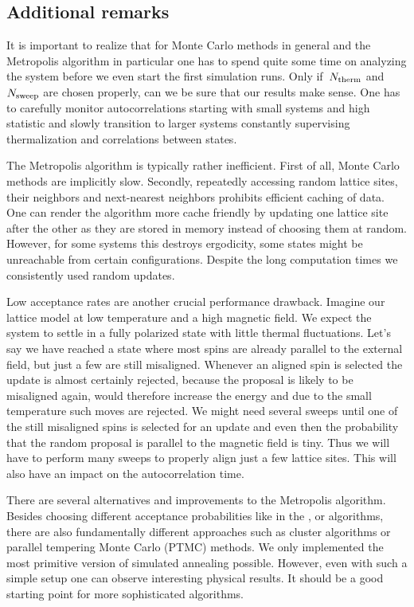 \subsection{Additional remarks}

It is important to realize that for Monte Carlo methods in general and the
Metropolis algorithm in particular one has to spend quite some time on analyzing
the system before we even start the first simulation runs. Only if~$N_{\mathrm{therm}}$
and~$N_{\mathrm{sweep}}$ are chosen properly, can we be sure that our results make sense.
One has to carefully monitor autocorrelations starting with small systems and
high statistic and slowly transition to larger systems constantly supervising
thermalization and correlations between states.

The Metropolis algorithm is typically rather inefficient. First of all, Monte
Carlo methods are implicitly slow. Secondly, repeatedly accessing random lattice
sites, their neighbors and next-nearest neighbors prohibits efficient caching of
data. One can render the algorithm more cache friendly by updating one lattice
site after the other as they are stored in memory instead of choosing them at
random. However, for some systems this destroys ergodicity, \ie{} some states
might be unreachable from certain configurations. Despite the long computation
times we consistently used random updates.

Low acceptance rates are another crucial performance drawback. Imagine our
lattice model at low temperature and a high magnetic field. We expect the system
to settle in a fully polarized state with little thermal fluctuations. Let's say
we have reached a state where most spins are already parallel to the external
field, but just a few are still misaligned. Whenever an aligned spin is selected
the update is almost certainly rejected, because the proposal is likely to be
misaligned again, would therefore increase the energy and due to the small
temperature such moves are rejected. We might need several sweeps until one of
the still misaligned spins is selected for an update and even then the
probability that the random proposal is parallel to the magnetic field is tiny.
Thus we will have to perform many sweeps to properly align just a few lattice
sites. This will also have an impact on the autocorrelation time.

There are several alternatives and improvements to the Metropolis algorithm.
Besides choosing different acceptance probabilities like in the
,  or  algorithms,
there are also fundamentally different approaches such as cluster algorithms or
parallel tempering Monte Carlo (PTMC) methods. We only implemented the most
primitive version of simulated annealing possible. However, even with such a
simple setup one can observe interesting physical results. It should be a good
starting point for more sophisticated algorithms.

